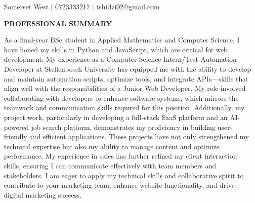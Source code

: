 \documentclass[11pt, a4paper]{article}
\newcommand{\cvsection}[1]{%
  \vspace{6pt}%
  \noindent%
  \colorbox{DKGreen}{\hspace{4pt}\rule{0pt}{14pt}\hspace{4pt}}%
  \colorbox{CardBG}{%
    \parbox[c][14pt]{\dimexpr\linewidth-16pt\relax}{%
      \hspace{8pt}\textcolor{DKGreen}{\textbf{\large\MakeUppercase{#1}}}%
    }%
  }%
  \par
  \noindent{\color{BorderClr}\rule{\linewidth}{0.6pt}}%
  \vspace{4pt}\par\noindent%
}
\begin{document}
\noindent\hspace{-6mm}%
\colorbox{HeaderBG}{%
  \begin{minipage}{\dimexpr\linewidth+12mm\relax}%
    \vspace{5mm}%
    \par\vspace{2mm}%
    \par\vspace{3mm}%
    \hspace{5mm}%
    \textcolor{HeaderContact}{Somerset West}\;
    \textcolor{HeaderSep}{$\vert$}\;
    \textcolor{HeaderContact}{0723333217}\;
    \textcolor{HeaderSep}{$\vert$}\;
    \textcolor{HeaderContact}{tshidzi02@gmail.com}
    \par\vspace{5mm}%
  \end{minipage}%
}

\vspace{4mm}

\cvsection{Professional Summary}
\noindent\textcolor{MidTxt}{As a final-year BSc student in Applied Mathematics and Computer Science, I have honed my skills in Python and JavaScript, which are critical for web development. My experience as a Computer Science Intern/Test Automation Developer at Stellenbosch University has equipped me with the ability to develop and maintain automation scripts, optimize tools, and integrate APIs—skills that align well with the responsibilities of a Junior Web Developer. My role involved collaborating with developers to enhance software systems, which mirrors the teamwork and communication skills required for this position. Additionally, my project work, particularly in developing a full-stack SaaS platform and an AI-powered job search platform, demonstrates my proficiency in building user-friendly and efficient applications. These projects have not only strengthened my technical expertise but also my ability to manage content and optimize performance. My experience in sales has further refined my client interaction skills, ensuring I can communicate effectively with team members and stakeholders. I am eager to apply my technical skills and collaborative spirit to contribute to your marketing team, enhance website functionality, and drive digital marketing success.}
\end{document}
